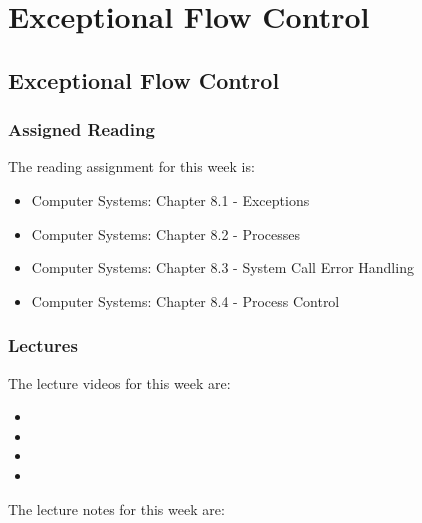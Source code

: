 \clearpage

\renewcommand{\ChapTitle}{Exceptional Flow Control}
\renewcommand{\SectionTitle}{Exceptional Flow Control}

\chapter{\ChapTitle}
\section{\SectionTitle}

\subsection{Assigned Reading}

The reading assignment for this week is:

\begin{itemize}
    \item Computer Systems: Chapter 8.1 - Exceptions
    \item Computer Systems: Chapter 8.2 - Processes
    \item Computer Systems: Chapter 8.3 - System Call Error Handling
    \item Computer Systems: Chapter 8.4 - Process Control
\end{itemize}

\subsection{Lectures}

The lecture videos for this week are:

\begin{itemize}
    \item {}
    \item {}
    \item {}
    \item {}
\end{itemize}

\noindent The lecture notes for this week are:

